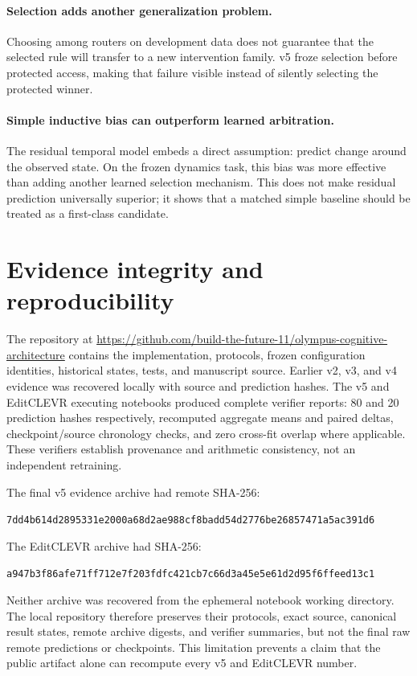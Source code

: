 \documentclass[10pt]{article}
\begin{document}
\paragraph{Selection adds another generalization problem.}
Choosing among routers on development data does not guarantee that the selected rule will
transfer to a new intervention family. v5 froze selection before protected access, making
that failure visible instead of silently selecting the protected winner.

\paragraph{Simple inductive bias can outperform learned arbitration.}
The residual temporal model embeds a direct assumption: predict change around the observed
state. On the frozen dynamics task, this bias was more effective than adding another learned
selection mechanism. This does not make residual prediction universally superior; it shows
that a matched simple baseline should be treated as a first-class candidate.

\section{Evidence integrity and reproducibility}
The repository at
\url{https://github.com/build-the-future-11/olympus-cognitive-architecture}
contains the implementation, protocols, frozen configuration identities, historical
states, tests, and manuscript source. Earlier v2, v3, and v4 evidence was recovered locally
with source and prediction hashes. The v5 and EditCLEVR executing notebooks produced
complete verifier reports: 80 and 20 prediction hashes respectively, recomputed aggregate
means and paired deltas, checkpoint/source chronology checks, and zero cross-fit overlap
where applicable. These verifiers establish provenance and arithmetic consistency, not an
independent retraining.

The final v5 evidence archive had remote SHA-256:
\begin{center}
\footnotesize\texttt{7dd4b614d2895331e2000a68d2ae988cf8badd54d2776be26857471a5ac391d6}
\end{center}
The EditCLEVR archive had SHA-256:
\begin{center}
\footnotesize\texttt{a947b3f86afe71ff712e7f203fdfc421cb7c66d3a45e5e61d2d95f6ffeed13c1}
\end{center}
Neither archive was recovered from the ephemeral notebook working directory. The local
repository therefore preserves their protocols, exact source, canonical result states,
remote archive digests, and verifier summaries, but not the final raw remote predictions
or checkpoints. This limitation prevents a claim that the public artifact alone can
recompute every v5 and EditCLEVR number.
\end{document}
